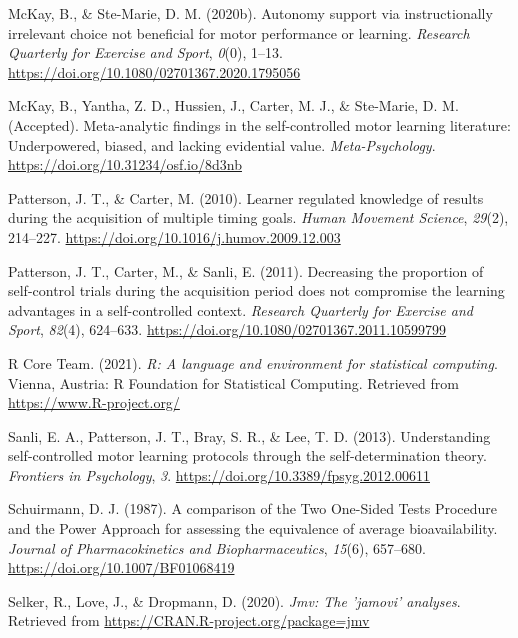 \documentclass[
  english,
  doc, donotrepeattitle,floatsintext]{apa7}
\newlength{\cslhangindent}
\newlength{\cslentryspacingunit} %
\newenvironment{CSLReferences}[2] %
 {%
  \setlength{\parindent}{0pt}
  \ifodd #1
  \let\oldpar\par
  \def\par{\hangindent=\cslhangindent\oldpar}
  \fi
  \setlength{\parskip}{#2\cslentryspacingunit}
 }%
 {}
\begin{document}
\begin{CSLReferences}{1}{0}
\leavevmode{}%
McKay, B., \& Ste-Marie, D. M. (2020b). Autonomy support via instructionally irrelevant choice not beneficial for motor performance or learning. \emph{Research Quarterly for Exercise and Sport}, \emph{0}(0), 1--13. \url{https://doi.org/10.1080/02701367.2020.1795056}

\leavevmode{}%
McKay, B., Yantha, Z. D., Hussien, J., Carter, M. J., \& Ste-Marie, D. M. (Accepted). Meta-analytic findings in the self-controlled motor learning literature: Underpowered, biased, and lacking evidential value. \emph{Meta-Psychology}. \url{https://doi.org/10.31234/osf.io/8d3nb}

\leavevmode{}%
Patterson, J. T., \& Carter, M. (2010). Learner regulated knowledge of results during the acquisition of multiple timing goals. \emph{Human Movement Science}, \emph{29}(2), 214--227. \url{https://doi.org/10.1016/j.humov.2009.12.003}

\leavevmode{}%
Patterson, J. T., Carter, M., \& Sanli, E. (2011). Decreasing the proportion of self-control trials during the acquisition period does not compromise the learning advantages in a self-controlled context. \emph{Research Quarterly for Exercise and Sport}, \emph{82}(4), 624--633. \url{https://doi.org/10.1080/02701367.2011.10599799}

\leavevmode{}%
R Core Team. (2021). \emph{R: A language and environment for statistical computing}. Vienna, Austria: R Foundation for Statistical Computing. Retrieved from \url{https://www.R-project.org/}

\leavevmode{}%
Sanli, E. A., Patterson, J. T., Bray, S. R., \& Lee, T. D. (2013). Understanding self-controlled motor learning protocols through the self-determination theory. \emph{Frontiers in Psychology}, \emph{3}. \url{https://doi.org/10.3389/fpsyg.2012.00611}

\leavevmode{}%
Schuirmann, D. J. (1987). A comparison of the Two One-Sided Tests Procedure and the Power Approach for assessing the equivalence of average bioavailability. \emph{Journal of Pharmacokinetics and Biopharmaceutics}, \emph{15}(6), 657--680. \url{https://doi.org/10.1007/BF01068419}

\leavevmode{}%
Selker, R., Love, J., \& Dropmann, D. (2020). \emph{Jmv: The 'jamovi' analyses}. Retrieved from \url{https://CRAN.R-project.org/package=jmv}


\end{CSLReferences}
\end{document}
